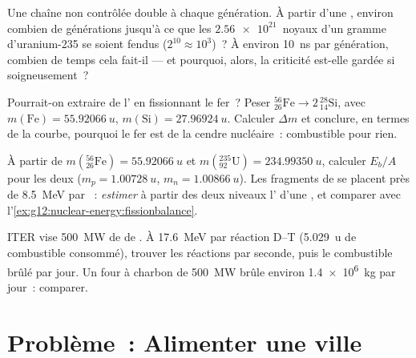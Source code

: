 \begin{exercise}[$\star\star\star$]\label{exo:g12:nuclear-energy:12}
Une chaîne non contrôlée double à chaque génération. À partir d'une
, environ combien de générations jusqu'à ce
que les $\num{2.56e21}$~noyaux d'un gramme d'uranium-235 se soient
fendus ($2^{10} \approx 10^{3}$)~? À environ \qty{10}{ns} par
génération, combien de temps cela fait-il --- et pourquoi, alors, la
criticité est-elle gardée si soigneusement~?
\end{exercise}

\begin{exercise}[$\star\star\star$]\label{exo:g12:nuclear-energy:13}
Pourrait-on extraire de l' en fissionnant
le fer~? Peser ${}^{56}_{26}\mathrm{Fe} \to 2\,{}^{28}_{14}\mathrm{Si}$,
avec $m(\mathrm{Fe}) = \qty{55.92066}{u}$,
$m(\mathrm{Si}) = \qty{27.96924}{u}$. Calculer $\Delta m$ et conclure,
en termes de la courbe, pourquoi le fer est de la cendre nucléaire~:
combustible pour rien.
\end{exercise}

\begin{exercise}[$\star\star\star$]\label{exo:g12:nuclear-energy:14}
À partir de $m({}^{56}_{26}\mathrm{Fe}) = \qty{55.92066}{u}$ et
$m({}^{235}_{92}\mathrm{U}) = \qty{234.99350}{u}$, calculer $E_b/A$
pour les deux ($m_p = \qty{1.00728}{u}$, $m_n = \qty{1.00866}{u}$). Les
fragments de  se placent près de
\qty{8.5}{MeV} par ~:
\emph{estimer} à partir des deux niveaux l'
d'une , et comparer avec
l'\cref{ex:g12:nuclear-energy:fissionbalance}.
\end{exercise}

\begin{exercise}[$\star\star\star$]\label{exo:g12:nuclear-energy:15}
ITER vise \qty{500}{MW} de  de
. À \qty{17.6}{MeV} par réaction D--T
(\qty{5.029}{u} de combustible consommé), trouver les réactions par
seconde, puis le combustible brûlé par jour. Un four à charbon de
\qty{500}{MW} brûle environ \qty{1.4e6}{kg} par jour~: comparer.
\end{exercise}

\section{Problème~: Alimenter une ville}

